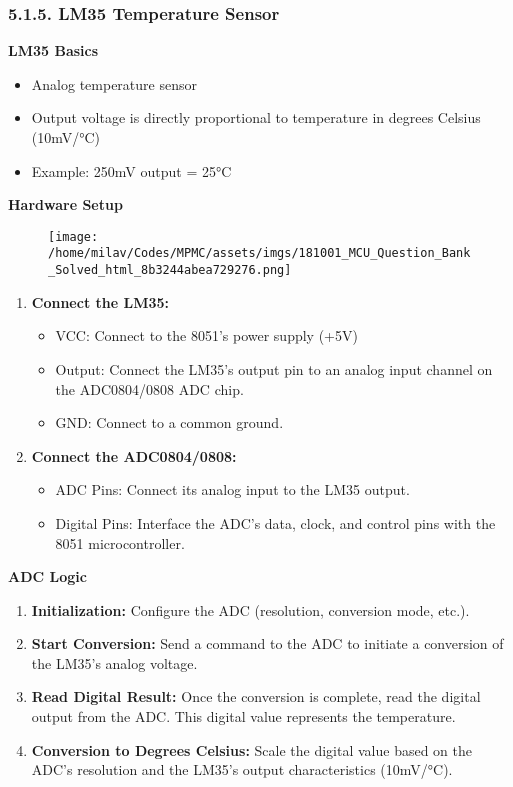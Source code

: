 \documentclass[
]{article}
\begin{document}
\hypertarget{515-lm35-temperature-sensor}{%
\subsubsection{5.1.5. LM35 Temperature
Sensor}\label{515-lm35-temperature-sensor}}

\textbf{LM35 Basics}

\begin{itemize}
\item
  Analog temperature sensor
\item
  Output voltage is directly proportional to temperature in degrees
  Celsius (10mV/°C)
\item
  Example: 250mV output = 25°C
\end{itemize}

\textbf{Hardware Setup}

\begin{figure}
\centering
\texttt{[image: /home/milav/Codes/MPMC/assets/imgs/181001\_MCU\_Question\_Bank\_Solved\_html\_8b3244abea729276.png]}
\caption{}
\end{figure}

\begin{enumerate}
\def\labelenumi{\arabic{enumi}.}
\item
  \textbf{Connect the LM35:}

  \begin{itemize}
  \item
    VCC: Connect to the 8051's power supply (+5V)
  \item
    Output: Connect the LM35's output pin to an analog input channel on
    the ADC0804/0808 ADC chip.
  \item
    GND: Connect to a common ground.
  \end{itemize}
\item
  \textbf{Connect the ADC0804/0808:}

  \begin{itemize}
  \item
    ADC Pins: Connect its analog input to the LM35 output.
  \item
    Digital Pins: Interface the ADC's data, clock, and control pins with
    the 8051 microcontroller.
  \end{itemize}
\end{enumerate}

\textbf{ADC Logic}

\begin{enumerate}
\def\labelenumi{\arabic{enumi}.}
\item
  \textbf{Initialization:} Configure the ADC (resolution, conversion
  mode, etc.).
\item
  \textbf{Start Conversion:} Send a command to the ADC to initiate a
  conversion of the LM35's analog voltage.
\item
  \textbf{Read Digital Result:} Once the conversion is complete, read
  the digital output from the ADC. This digital value represents the
  temperature.
\item
  \textbf{Conversion to Degrees Celsius:} Scale the digital value based
  on the ADC's resolution and the LM35's output characteristics
  (10mV/°C).
\end{enumerate}
\end{document}
